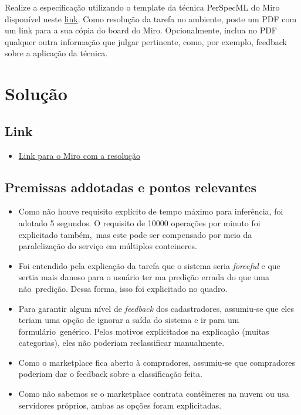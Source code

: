 \documentclass[10pt, a4paper]{article}
\begin{document}
Realize a especificação utilizando o template da técnica PerSpecML do Miro disponível neste  \href{https://miro.com/miroverse/perspecml-machine-learning/}{link}. 
Como resolução da tarefa no ambiente, poste um PDF com um link para a sua cópia do board do Miro. Opcionalmente, inclua no PDF qualquer outra informação que julgar 
pertinente, como, por exemplo, feedback sobre a aplicação da técnica.

\section{Solução}

\subsection{Link}

\begin{itemize}
    \item \href{https://miro.com/app/board/uXjVMUQCfBQ=/}{Link para o Miro com a resolução}
\end{itemize}

\subsection{Premissas addotadas e pontos relevantes}

\begin{itemize}
    \item Como não houve requisito explícito de tempo máximo para inferência, foi adotado 5 segundos. O requisito de 10000 operações por minuto foi explicitado também,\ 
    mas este pode ser compensado por meio da paralelização do serviço em múltiplos conteineres.
    \item Foi entendido pela explicação da tarefa que o sistema seria \textit{forceful} e que sertia mais danoso para o usuário ter ma predição errada do que uma não\
    predição. Dessa forma, isso foi explicitado no quadro.
    \item Para garantir algum nível de \textit{feedback} dos cadastradores, assumiu-se que eles teriam uma opção de ignorar a saída do sistema e ir para um formulário\
    genérico. Pelos motivos explicitados na explicação (muitas categorias), eles não poderiam reclassificar manualmente.
    \item Como o marketplace fica aberto à compradores, assumiu-se que compradores poderiam dar o feedback sobre a classificação feita.
    \item Como não sabemos se o marketplace contrata contêineres na nuvem ou usa servidores próprios, ambas as opções foram explicitadas.
\end{itemize}
\end{document}

